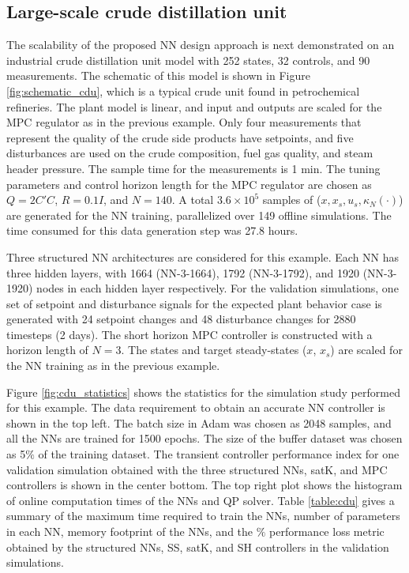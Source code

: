 \documentclass[preprint,5p, twocolumn, authoryear]{elsarticle}
\begin{document}
\subsection{Large-scale crude distillation unit}

The scalability of the proposed NN design approach is next demonstrated on an
industrial crude distillation unit model
\citep*{pannocchia:rawlings:wright:2007} with 252 states, 32 controls, and 90
measurements. The schematic of this model is shown in Figure
\ref{fig:schematic_cdu}, which is a typical crude unit found in petrochemical
refineries. The plant model is linear, and input and outputs are scaled for the
MPC regulator as in the previous example. Only four measurements that represent
the quality of the crude side products have setpoints, and five disturbances are
used on the crude composition, fuel gas quality, and steam header pressure. The
sample time for the measurements is 1 min. The tuning parameters and control
horizon length for the MPC regulator are chosen as $Q = 2C'C$, $R = 0.1I$, and
$N = 140$. A total $3.6 \times 10^5$ samples of ($x, x_s, u_s, \kappa_N(\cdot)$)
are generated for the NN training, parallelized over 149 offline simulations.
The time consumed for this data generation step was 27.8 hours.

Three structured NN architectures are considered for this example. Each NN has
three hidden layers, with 1664 (NN-3-1664), 1792 (NN-3-1792), and 1920
(NN-3-1920) nodes in each hidden layer respectively. For the validation
simulations, one set of setpoint and disturbance signals for the expected plant
behavior case is generated with 24 setpoint changes and 48 disturbance changes
for 2880 timesteps (2 days). The short horizon MPC controller is constructed
with a horizon length of $N = 3$. The states and target steady-states ($x$,
$x_s$) are scaled for the NN training as in the previous example. 

Figure \ref{fig:cdu_statistics} shows the statistics for the simulation study
performed for this example. The data requirement to obtain an accurate NN
controller is shown in the top left. The batch size in Adam was chosen as 2048
samples, and all the NNs are trained for 1500 epochs. The size of the buffer
dataset was chosen as 5$\%$ of the training dataset. The transient controller
performance index for one validation simulation obtained with the three
structured NNs, satK, and MPC controllers is shown in the center bottom. The top
right plot shows the histogram of online computation times of the NNs and QP
solver. Table \ref{table:cdu} gives a summary of the maximum time required to
train the NNs, number of parameters in each NN, memory footprint of the NNs, and
the $\%$ performance loss metric obtained by the structured NNs, SS, satK, and
SH controllers in the validation simulations. 
\end{document}
